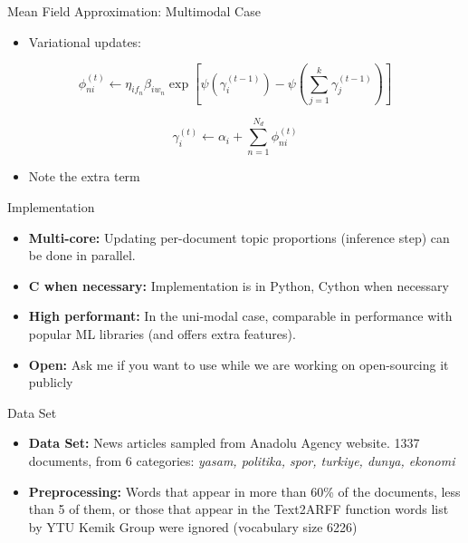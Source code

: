 \documentclass[pdf]{beamer}
\begin{document}
\begin{frame}{Mean Field Approximation: Multimodal Case}
	\begin{itemize}
		\item Variational updates:
	\end{itemize}
	\begin{equation*}
		\phi_{ni}^{(t)} \gets \eta_{i f_n} \beta_{i w_n} \exp\left[\psi\left(\gamma_{i}^{(t-1)}\right) - \psi\left({\sum_{j=1}^k \gamma_j^{(t-1)}}\right)\right]
	\end{equation*}
	
	\begin{equation*}
		\gamma_i^{(t)}\gets \alpha_i + \sum_{n=1}^{N_d} \phi_{ni}^{(t)}
	\end{equation*}
	\begin{itemize}
		\item Note the extra term
	\end{itemize}

\end{frame}

\begin{frame}{Implementation}
	\begin{itemize}
		\item {\bf Multi-core:} Updating per-document topic proportions (inference step) can be done in parallel. 
		\item {\bf C when necessary:} Implementation is in Python, Cython when necessary
		\item {\bf High performant:} In the uni-modal case, comparable in performance with popular ML libraries (and offers extra features).
		\item {\bf Open:} Ask me if you want to use while we are working on open-sourcing it publicly
	\end{itemize}
\end{frame}


\begin{frame}{Data Set}
	
	\begin{itemize}
		\item {\bf Data Set:} News articles sampled from Anadolu Agency website. 1337 documents, from 6 categories: \textit{yasam, politika, spor, turkiye, dunya, ekonomi}
		\item {\bf Preprocessing:} Words that appear in more than 60\% of the documents, less than 5 of them, or those that appear in the Text2ARFF function words list by YTU Kemik Group were ignored (vocabulary size 6226)
	\end{itemize}
	
\end{frame}
\end{document}
